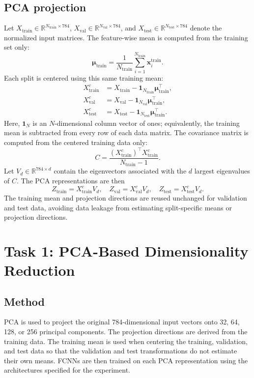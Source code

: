 \documentclass[conference,onecolumn]{IEEEtran}
\begin{document}
\subsection{PCA projection}
Let $X_{\mathrm{train}}\in\mathbb{R}^{N_{\mathrm{train}}\times784}$,
$X_{\mathrm{val}}\in\mathbb{R}^{N_{\mathrm{val}}\times784}$, and
$X_{\mathrm{test}}\in\mathbb{R}^{N_{\mathrm{test}}\times784}$ denote the
normalized input matrices. The feature-wise mean is computed from the training
set only:
\begin{equation}
\boldsymbol{\mu}_{\mathrm{train}}
=\frac{1}{N_{\mathrm{train}}}
\sum_{i=1}^{N_{\mathrm{train}}}\mathbf{x}_{i}^{\mathrm{train}}.
\end{equation}
Each split is centered using this same training mean:
\begin{align}
X_{\mathrm{train}}^{c}
&=X_{\mathrm{train}}-\mathbf{1}_{N_{\mathrm{train}}}
\boldsymbol{\mu}_{\mathrm{train}}^{\top},\\
X_{\mathrm{val}}^{c}
&=X_{\mathrm{val}}-\mathbf{1}_{N_{\mathrm{val}}}
\boldsymbol{\mu}_{\mathrm{train}}^{\top},\\
X_{\mathrm{test}}^{c}
&=X_{\mathrm{test}}-\mathbf{1}_{N_{\mathrm{test}}}
\boldsymbol{\mu}_{\mathrm{train}}^{\top}.
\end{align}
Here, $\mathbf{1}_{N}$ is an $N$-dimensional column vector of ones; equivalently,
the training mean is subtracted from every row of each data matrix. The covariance
matrix is computed from the centered training data only:
\begin{equation}
C=\frac{(X_{\mathrm{train}}^{c})^{\top}X_{\mathrm{train}}^{c}}
{N_{\mathrm{train}}-1}.
\end{equation}
Let $V_d\in\mathbb{R}^{784\times d}$ contain the eigenvectors associated with
the $d$ largest eigenvalues of $C$. The PCA representations are then
\begin{equation}
Z_{\mathrm{train}}=X_{\mathrm{train}}^{c}V_d,\quad
Z_{\mathrm{val}}=X_{\mathrm{val}}^{c}V_d,\quad
Z_{\mathrm{test}}=X_{\mathrm{test}}^{c}V_d.
\end{equation}
The training mean and projection directions are reused unchanged for validation
and test data, avoiding data leakage from estimating split-specific means or
projection directions.

\section{Task 1: PCA-Based Dimensionality Reduction}
\subsection{Method}
PCA is used to project the original 784-dimensional input vectors onto 32, 64, 128, or 256 principal components. The projection directions are derived from the training data. The training mean is used when centering the training, validation, and test data so that the validation and test transformations do not estimate their own means. FCNNs are then trained on each PCA representation using the architectures specified for the experiment.
\end{document}
